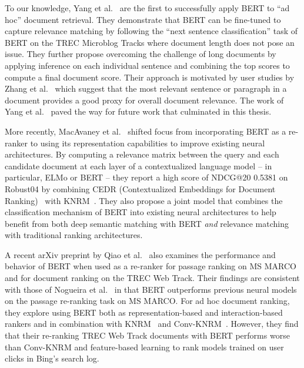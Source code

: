 To our knowledge, Yang et al.~\cite{yang2019simple} are the first to successfully apply BERT to ``ad hoc'' document retrieval.
They demonstrate that BERT can be fine-tuned to capture relevance matching by following the ``next sentence classification'' task of BERT on the TREC Microblog Tracks where document length does not pose an issue.
They further propose overcoming the challenge of long documents by applying inference on each individual sentence and combining the top scores to compute a final document score.
Their approach is motivated by user studies by Zhang et al.~\cite{zhang2018effective} which suggest that the most relevant sentence or paragraph in a document provides a good proxy for overall document relevance.
The work of Yang et al.~\cite{yang2019simple} paved the way for future work that culminated in this thesis.

More recently, MacAvaney et al.~\cite{MacAvaney_etal_SIGIR2019} shifted focus from incorporating BERT as a re-ranker to using its representation capabilities to improve existing neural architectures.
By computing a relevance matrix between the query and each candidate document at each layer of a contextualized language model -- in particular, ELMo or BERT --  they report a high score of NDCG@20 0.5381 on Robust04 by combining CEDR (Contextualized Embeddings for Document Ranking)~\cite{MacAvaney_etal_SIGIR2019} with KNRM~\cite{xiong2017knrm}.
They also propose a joint model that combines the classification mechanism of BERT into existing neural architectures to help benefit from both deep semantic matching with BERT \textit{and} relevance matching with traditional ranking architectures.

A recent arXiv preprint by Qiao et al.~\cite{Qiao:1904.07531:2019} also examines the performance and behavior of BERT when used as a re-ranker for passage ranking on MS MARCO and for document ranking on the TREC Web Track.
Their findings are consistent with those of Nogueira et al.~\cite{nogueira2019passage} in that BERT outperforms previous neural models on the passage re-ranking task on MS MARCO.
For ad hoc document ranking, they explore using BERT both as representation-based and interaction-based rankers and in combination with KNRM~\cite{xiong2017knrm} and Conv-KNRM~\cite{dai2018convolutional}.
However, they find that their re-ranking TREC Web Track documents with BERT performs worse than Conv-KNRM and feature-based learning to rank models trained on user clicks in Bing's search log.

